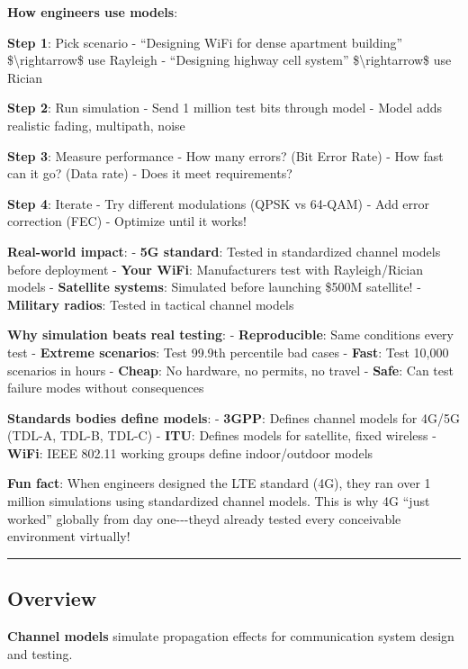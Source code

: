\textbf{How engineers use models}:

\textbf{Step 1}: Pick scenario - ``Designing WiFi for dense apartment
building'' \$\textbackslash rightarrow\$ use Rayleigh - ``Designing
highway cell system'' \$\textbackslash rightarrow\$ use Rician

\textbf{Step 2}: Run simulation - Send 1 million test bits through model
- Model adds realistic fading, multipath, noise

\textbf{Step 3}: Measure performance - How many errors? (Bit Error Rate)
- How fast can it go? (Data rate) - Does it meet requirements?

\textbf{Step 4}: Iterate - Try different modulations (QPSK vs 64-QAM) -
Add error correction (FEC) - Optimize until it works!

\textbf{Real-world impact}: - \textbf{5G standard}: Tested in
standardized channel models before deployment - \textbf{Your WiFi}:
Manufacturers test with Rayleigh/Rician models - \textbf{Satellite
systems}: Simulated before launching \$500M satellite! -
\textbf{Military radios}: Tested in tactical channel models

\textbf{Why simulation beats real testing}: - \textbf{Reproducible}:
Same conditions every test - \textbf{Extreme scenarios}: Test 99.9th
percentile bad cases - \textbf{Fast}: Test 10,000 scenarios in hours -
\textbf{Cheap}: No hardware, no permits, no travel - \textbf{Safe}: Can
test failure modes without consequences

\textbf{Standards bodies define models}: - \textbf{3GPP}: Defines
channel models for 4G/5G (TDL-A, TDL-B, TDL-C) - \textbf{ITU}: Defines
models for satellite, fixed wireless - \textbf{WiFi}: IEEE 802.11
working groups define indoor/outdoor models

\textbf{Fun fact}: When engineers designed the LTE standard (4G), they
ran over 1 million simulations using standardized channel models. This
is why 4G ``just worked'' globally from day
one-\/-\/-they\textquotesingle d already tested every conceivable
environment virtually!

\begin{center}\rule{0.5\linewidth}{0.5pt}\end{center}

\subsection{Overview}\label{overview}

\textbf{Channel models} simulate propagation effects for communication
system design and testing.

